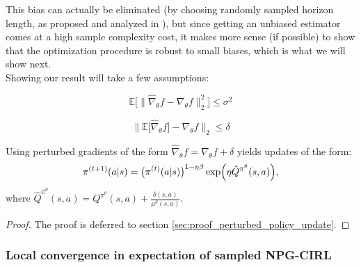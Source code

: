 This bias can actually be eliminated (by choosing randomly sampled horizon length, as proposed and analyzed in \cite{DingY2021}), but since getting an unbiased estimator comes at a high sample complexity cost, it makes more sense (if possible) to show that the optimization procedure is robust to small biases, which is what we will show next. \\

\noindent
Showing our result will take a few assumptions:

\begin{assumption}
    \label{assumption:bounded_var_grad_est}
    \[ \mathbb{E}\Big[ \| \hat{\nabla}_\theta f - {\nabla}_\theta f  \|_2^2 \Big] \leq \sigma^2 \]
\end{assumption}

\begin{assumption}
    \label{assumption:bounded_bias_grad_est}
    \[  \| \mathbb{E}\big[ \hat{\nabla}_\theta f \big]- {\nabla}_\theta f  \|_2 \leq \delta \]
\end{assumption}

\begin{lemma}
    \label{lemma:perturbed_policy_updates}
    Using perturbed gradients of the form $\hat{\nabla}_\theta f = {\nabla}_\theta f + \delta$ yields updates of the form:
    \[\pi^{(t+1)}(a|s)  = \big(\pi^{(t)}(a|s) \big)^{1-\eta \beta} \exp \Bigl( \eta \hat{Q}^{\pi^\theta}(s,a) \Bigr), \]
    where $ \hat{Q}^{\pi^\theta}(s,a) =  {Q}^{\pi^\theta}(s,a) + \frac{\delta(s,a)}{\mu^\theta(s,a)}$. 
    \begin{proof}
        The proof is deferred to section \ref{sec:proof_perturbed_policy_update}.
    \end{proof}
\end{lemma}

\subsubsection{Local convergence in expectation of sampled NPG-CIRL}



